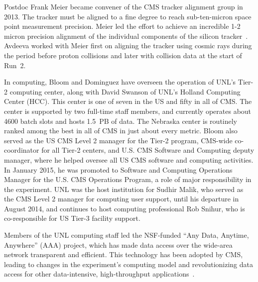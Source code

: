 Postdoc Frank Meier became convener of the CMS tracker alignment group in 2013.  The tracker must be aligned to a fine degree to reach sub-ten-micron space point measurement precision.  Meier led the effort to achieve an incredible 1-2 micron precision alignment of the individual components of the silicon tracker~\cite{bib:alignment}.  Avdeeva worked with Meier first on aligning the tracker using cosmic rays during the period before proton collisions and later with collision data at the start of Run~2.

In computing, Bloom and Dominguez have overseen the operation of UNL’s Tier-2 computing center, along with David Swanson of UNL’s Holland Computing Center (HCC). This center is one of seven in the US and fifty in all of CMS. The center is supported by two full-time staff members, and currently operates about 4600 batch slots and hosts 1.5~PB of data. The Nebraska center is routinely ranked among the best in all of CMS in just about every metric. Bloom also served as the US CMS Level 2 manager for the Tier-2 program, CMS-wide co-coordinator for all Tier-2 centers, and U.S. CMS Software and Computing deputy manager, where he helped oversee all US CMS software and computing activities.  In January 2015, he was promoted to Software and Computing Operations Manager for the U.S. CMS Operations Program, a role of major responsibility in the experiment.  UNL was the host institution for Sudhir Malik, who served as the CMS Level 2 manager for computing user support, until his departure in August 2014, and continues to host computing professional Rob Snihur, who is co-responsible for US Tier-3 facility support.

Members of the UNL computing staff led the NSF-funded ``Any Data, Anytime, Anywhere'' (AAA) project, which has made data access over the wide-area network transparent and efficient. This technology has been adopted by CMS, leading to changes in the experiment's computing model and revolutionizing data access for other data-intensive, high-throughput applications~\cite{bib:AAA}.

